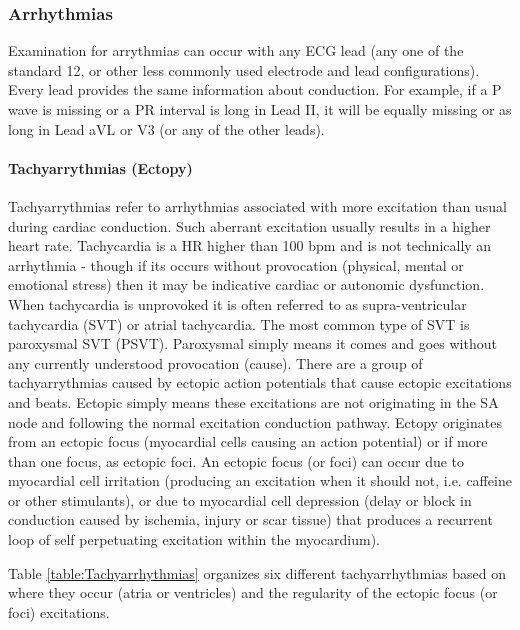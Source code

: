 \subsubsection{Arrhythmias}

Examination for arrythmias can occur with any ECG lead (any one of the standard 12, or other less commonly used electrode and lead configurations). Every lead provides the same information about conduction. For example, if a P wave is missing or a PR interval is long in Lead II, it will be equally missing or as long in Lead aVL or V3 (or any of the other leads). 

\paragraph{Tachyarrythmias (Ectopy)}

Tachyarrythmias refer to arrhythmias associated with more excitation than usual during cardiac conduction. Such aberrant excitation usually results in a higher heart rate. Tachycardia is a HR higher than 100 bpm and is not technically an arrhythmia - though if its occurs without provocation (physical, mental or emotional stress) then it may be indicative cardiac or autonomic dysfunction. When tachycardia is unprovoked it is often referred to as supra-ventricular tachycardia (SVT) or atrial tachycardia. The most common type of SVT is paroxysmal SVT (PSVT). Paroxysmal simply means it comes and goes without any currently understood provocation (cause).
There are a group of tachyarrythmias caused by ectopic action potentials that cause ectopic excitations and beats. Ectopic simply means these excitations are not originating in the SA node and following the normal excitation conduction pathway. Ectopy originates from an ectopic focus (myocardial cells causing an action potential) or if more than one focus, as ectopic foci. An ectopic focus (or foci) can occur due to myocardial cell irritation (producing an excitation when it should not, i.e. caffeine or other stimulants), or due to myocardial cell depression (delay or block in conduction caused by ischemia, injury or scar tissue) that produces a recurrent loop of self perpetuating excitation within the myocardium). 

Table \ref{table:Tachyarrhythmias} organizes six different tachyarrhythmias based on where they occur (atria or ventricles) and the regularity of the ectopic focus (or foci) excitations.


